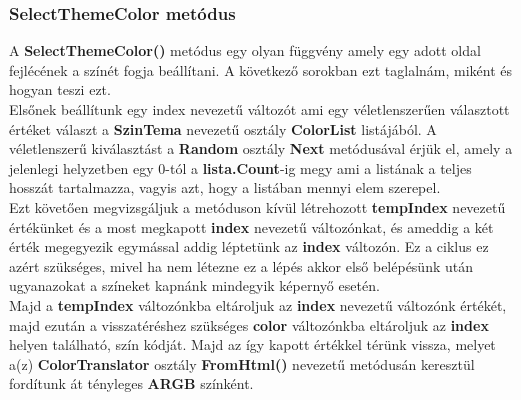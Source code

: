 \documentclass[tocnopagenum]{thesis-ekf}
\theoremstyle{definition}
\theoremstyle{remark}
\begin{document}
	\subsubsection{SelectThemeColor metódus}
	A \textbf{SelectThemeColor()} metódus egy olyan függvény amely egy adott oldal fejlécének a színét fogja beállítani. A következő sorokban ezt taglalnám, miként és hogyan teszi ezt. 
	\\
	Elsőnek beállítunk egy index nevezetű változót ami egy véletlenszerűen választott értéket választ a \textbf{SzinTema} nevezetű osztály \textbf{ColorList} listájából. A véletlenszerű kiválasztást a \textbf{Random} osztály \textbf{Next} metódusával érjük el, amely a jelenlegi helyzetben egy 0-tól a \textbf{lista.Count}-ig megy ami a listának a teljes hosszát tartalmazza, vagyis azt, hogy a listában mennyi elem szerepel. 
	\\
	Ezt követően megvizsgáljuk a metóduson kívül létrehozott \textbf{tempIndex} nevezetű értékünket és a most megkapott \textbf{index} nevezetű változónkat, és ameddig a két érték megegyezik egymással addig léptetünk az \textbf{index} változón. Ez a ciklus ez azért szükséges, mivel ha nem létezne ez a lépés akkor első belépésünk után ugyanazokat a színeket kapnánk mindegyik képernyő esetén. 
	\\
	Majd a \textbf{tempIndex} változónkba eltároljuk az \textbf{index} nevezetű változónk értékét, majd ezután a visszatéréshez szükséges \textbf{color} változónkba eltároljuk az \textbf{index} helyen található, szín kódját. Majd az így kapott értékkel térünk vissza, melyet a(z) \textbf{ColorTranslator} osztály \textbf{FromHtml()} nevezetű metódusán keresztül fordítunk át tényleges \textbf{ARGB} színként.
	
	
\end{document}
